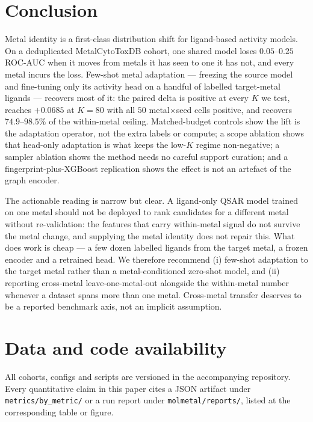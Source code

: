 \section{Conclusion}
\label{sec:conclusion}

Metal identity is a first-class distribution shift for ligand-based activity
models. On a deduplicated MetalCytoToxDB cohort, one shared model loses
$0.05$--$0.25$ ROC-AUC when it moves from metals it has seen to one it has not,
and every metal incurs the loss. Few-shot metal adaptation --- freezing the
source model and fine-tuning only its activity head on a handful of labelled
target-metal ligands --- recovers most of it: the paired delta is positive at
every $K$ we test, reaches $+0.0685$ at $K{=}80$ with all $50$
metal$\times$seed cells positive, and recovers $74.9$--$98.5\%$ of the
within-metal ceiling. Matched-budget controls show the lift is the adaptation
operator, not the extra labels or compute; a scope ablation shows that head-only
adaptation is what keeps the low-$K$ regime non-negative; a sampler ablation
shows the method needs no careful support curation; and a fingerprint-plus-XGBoost
replication shows the effect is not an artefact of the graph encoder.

The actionable reading is narrow but clear. A ligand-only QSAR model trained on
one metal should not be deployed to rank candidates for a different metal without
re-validation: the features that carry within-metal signal do not survive the
metal change, and supplying the metal identity does not repair this. What does
work is cheap --- a few dozen labelled ligands from the target metal, a frozen
encoder and a retrained head. We therefore recommend (i) few-shot adaptation to
the target metal rather than a metal-conditioned zero-shot model, and
(ii) reporting cross-metal leave-one-metal-out alongside the within-metal number
whenever a dataset spans more than one metal. Cross-metal transfer deserves to
be a reported benchmark axis, not an implicit assumption.

\section*{Data and code availability}

All cohorts, configs and scripts are versioned in the accompanying repository.
Every quantitative claim in this paper cites a JSON artifact under
\texttt{metrics/by\_metric/} or a run report under \texttt{molmetal/reports/},
listed at the corresponding table or figure.
